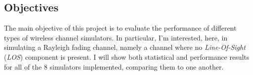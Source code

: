 \subsection{Objectives} %
\label{subsec:objectives}

The main objective of this project is to evaluate the performance of different types of wireless channel simulators. In particular, I'm interested, here, in simulating a Rayleigh fading channel, namely a channel where no \textit{Line-Of-Sight} (\textit{LOS}) component is present. I will show both statistical and performance results for all of the 8 simulators implemented, comparing them to one another.